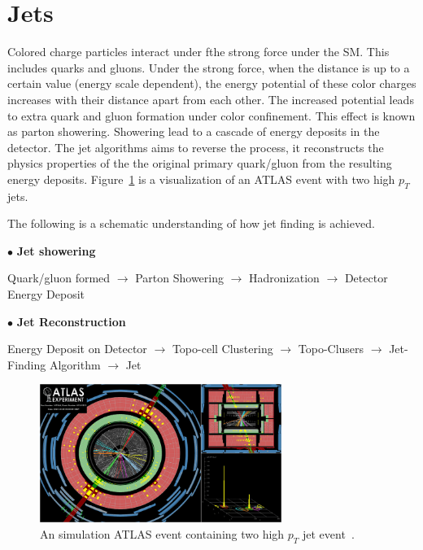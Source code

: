 \section{Jets}
\label{sec:Jet}
Colored charge particles interact under fthe strong force under the SM. This includes quarks and gluons. Under the strong force, when the distance is up to a certain value (energy scale dependent), the energy potential of these color charges increases with their distance apart from each other. The increased potential leads to extra quark and gluon formation under color confinement. This effect is known as parton showering. 
Showering lead to a cascade of energy deposits in the detector. The jet algorithms aims to reverse the process, it reconstructs the physics properties of the the original primary quark/gluon from the resulting energy deposits. Figure~\ref{fig:jetEvent} is a visualization of an ATLAS event with two high $p_{T}$ jets.

The following is a schematic understanding of how jet finding is achieved. 

$\bullet$ \textbf{Jet showering}

Quark/gluon formed $\rightarrow$  Parton Showering $\rightarrow$ Hadronization $\rightarrow$ Detector Energy Deposit

$\bullet$ \textbf{Jet Reconstruction}

Energy Deposit on Detector  $\rightarrow$  Topo-cell Clustering $\rightarrow$  Topo-Clusers $\rightarrow$  Jet-Finding Algorithm $\rightarrow$ Jet


\begin{figure}[!htb]
    \begin{center}
        \includegraphics[width=0.7\textwidth]{figures/common_ana/JetEvent}
        \caption{        
            An simulation ATLAS event containing two high $p_{T}$ jet event~\cite{jetEvent}.
        }
        \label{fig:jetEvent}
    \end{center}
\end{figure}

